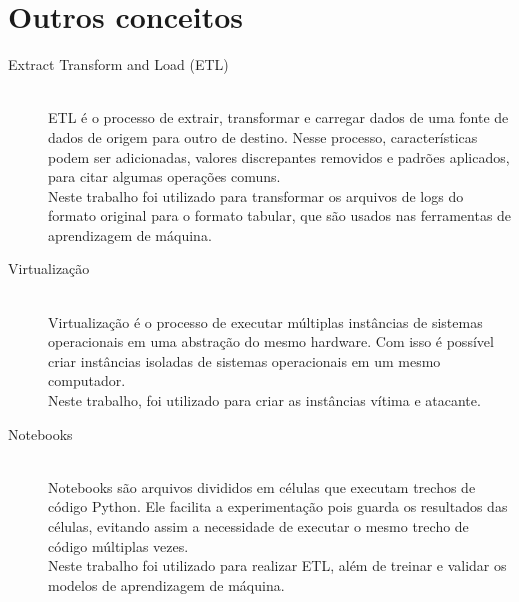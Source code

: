 \section{Outros conceitos}

\begin{description}
    \item[Extract Transform and Load (ETL)] \hfill \\ ETL é o processo de extrair, transformar 
    e carregar dados de uma fonte de dados de origem para outro de destino. Nesse processo, 
    características podem ser adicionadas, valores discrepantes removidos e padrões aplicados,
    para citar algumas operações comuns. \\ 
    Neste trabalho foi utilizado para transformar os arquivos de logs do formato original para 
    o formato tabular, que são usados nas ferramentas de aprendizagem de máquina.
    \item[Virtualização] \hfill \\ Virtualização é o processo de executar múltiplas instâncias 
    de sistemas operacionais em uma abstração do mesmo hardware. Com isso é possível 
    criar instâncias isoladas de sistemas operacionais em um mesmo computador. \\
    Neste trabalho, foi utilizado para criar as instâncias vítima e atacante.
    \item[Notebooks] \hfill \\ Notebooks são arquivos divididos em células que executam
    trechos de código Python. Ele facilita a experimentação pois guarda os resultados das
    células, evitando assim a necessidade de executar o mesmo trecho de código múltiplas
    vezes. \\ 
    Neste trabalho foi utilizado para realizar ETL, além de treinar e validar os modelos
    de aprendizagem de máquina. 
\end{description}